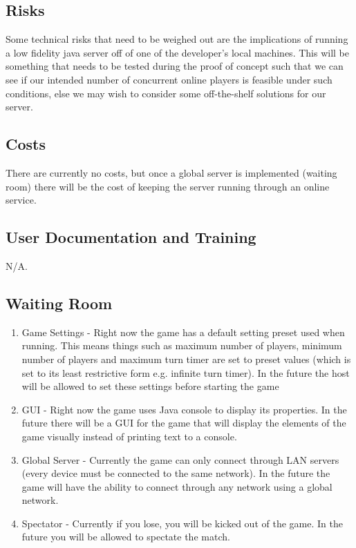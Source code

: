 \documentclass[12pt, titlepage]{article}
\begin{document}
\subsection{Risks}
Some technical risks that need to be weighed out are the implications of running a low fidelity java server off of one of the developer's local machines. This will be something that needs to be tested during the proof of concept such that we can see if our intended number of concurrent online players is feasible under such conditions, else we may wish to consider some off-the-shelf solutions for our server. 

\subsection{Costs}
There are currently no costs, but once a global server is implemented (waiting room) there will be the cost of keeping the server running through an online service.

\subsection{User Documentation and Training}
N/A.
\subsection{Waiting Room}
\begin{enumerate}
    \item Game Settings - Right now the game has a default setting preset used when running. This means things such as maximum number of players, minimum number of players and maximum turn timer are set to preset values (which is set to its least restrictive form e.g. infinite turn timer). In the future the host will be allowed to set these settings before starting the game
    
    \item GUI - Right now the game uses Java console to display its properties. In the future there will be a GUI for the game that will display the elements of the game visually instead of printing text to a console. 
    
    \item Global Server - Currently the game can only connect through LAN servers (every device must be connected to the same network). In the future the game will have the ability to connect through any network using a global network.
    
    \item Spectator - Currently if you lose, you will be kicked out of the game. In the future you will be allowed to spectate the match.

\end{enumerate}
    
\end{document}
